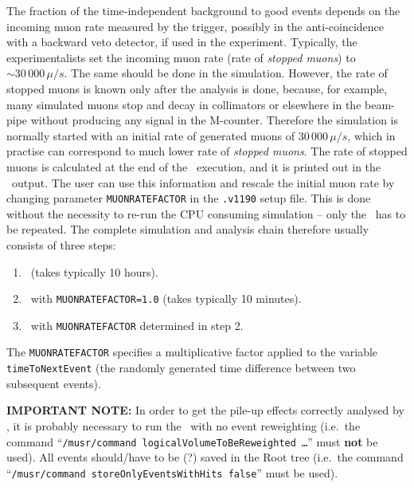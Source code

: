 \documentclass[twoside]{dis04}
\begin{document}
The fraction of the time-independent background to good events depends on the incoming muon rate
measured by the trigger, possibly in the anti-coincidence with a backward veto detector, if
used in the experiment.  
Typically, the experimentalists set the incoming muon rate (rate of \emph{stopped muons})
to $\sim 30\,000\,\mu/s$.  The same should be done in the simulation.
However, the rate of stopped muons is known only after the analysis is done,
because, for example, many simulated muons stop and decay in collimators or elsewhere 
in the beam-pipe without producing any signal in the M-counter.
Therefore the simulation is normally started with an initial rate of generated muons
of $30\,000\,\mu/s$, which in practise can correspond to much lower rate of \emph{stopped muons}.
The rate of stopped muons is calculated at the end of the \musrSimAna\ execution, and
it is printed out in the \musrSimAna\ output.  The user can use this information and rescale the
initial muon rate by changing parameter {\tt MUONRATEFACTOR} in the {\tt *.v1190} setup file. 
This is done without the necessity to re-run the CPU consuming 
simulation -- only the \musrSimAna\ has to be repeated.  The complete simulation and analysis
chain therefore usually consists of three steps:
%
\begin{enumerate}
  \item \musrSim\  (takes typically 10 hours).
  \item \musrSimAna\  with {\tt MUONRATEFACTOR=1.0} (takes typically 10 minutes).
  \item \musrSimAna\  with {\tt MUONRATEFACTOR} determined in step 2.
\end{enumerate}
%
The {\tt MUONRATEFACTOR} specifies a multiplicative factor applied to
the variable {\tt timeToNextEvent} 
(the randomly generated time difference between two subsequent events).

{\bf IMPORTANT NOTE:} In order to get the pile-up effects correctly analysed by \musrSimAna, 
it is probably necessary to run the \musrSim\ with no event reweighting (i.e.\
the command ``{\tt /musr/command logicalVolumeToBeReweighted \ldots}'' must {\bf not} be used).
All events should/have to be (?) saved in the Root tree
(i.e.\ the command ``{\tt /musr/command storeOnlyEventsWithHits false}'' must be used).


\end{document}
